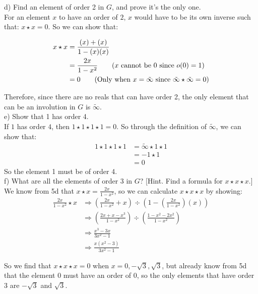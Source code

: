 \documentclass[20pt]{article}
\begin{document}
\begin{text}
    \noindent
    d) Find an element of order 2 in $G$, and prove it’s the only one.\\

    For an element $x$ to have an order of $2$, $x$ would have to be its own inverse such that: $x \star x = 0$. So we can show that:
    
    \begin{align}
        x \star x &= \frac{(x) + (x)}{1 - (x)(x)}\nonumber\\
        &= \frac{2x}{1-x^2}\tag{$x$ cannot be 0 since $o(0) = 1$}\nonumber\\
        &= 0\tag{Only when $x = \tilde{\infty}$ since $\tilde{\infty} \star \tilde{\infty} = 0$}\nonumber
    \end{align}

    Therefore, since there are no reals that can have order 2, the only element that can be an involution in $G$ is $\tilde{\infty}$.\\

    \noindent
    e) Show that 1 has order 4.\\
    
    If $1$ has order $4$, then $1 \star 1 \star 1 \star 1 = 0$. So through the definition of $\tilde{\infty}$, we can show that:
    \begin{align}
        1 \star 1 \star 1 \star 1 &= \tilde{\infty} \star 1 \star 1\nonumber\\
        &= -1 \star 1\nonumber\\
        &= 0\nonumber
    \end{align}
    So the element 1 must be of order 4.\\
    
    \noindent
    f) What are all the elements of order 3 in $G$? [Hint. Find a formula for $x \star x \star x$.]\\
    
    We know from 5d that $x \star x = \frac{2x}{1-x^2}$, so we can calculate $x \star x \star x$ by showing:
    \begin{align}
        \frac{2x}{1-x^2} \star x &\Longrightarrow (\frac{2x}{1-x^2} + x) \div (1 - (\frac{2x}{1-x^2})(x))\nonumber\\
        &\Longrightarrow (\frac{2x + x - x^3}{1 - x^2}) \div (\frac{1 - x^2 -2x^2}{1 - x^2})\nonumber\\
        &\Longrightarrow \frac{x^3 - 3x}{3x^2 - 1}\nonumber\\
        &\Longrightarrow \frac{x(x^2 - 3)}{3x^2 - 1}\nonumber
    \end{align}
    
    So we find that $x \star x \star x = 0$ when $x = 0, -\sqrt{3}, \sqrt{3}$, but already know from 5d that the element $0$ must have an order of 0, so the only elements that have order 3 are $-\sqrt{3}$ and $\sqrt{3}$.
\end{text}
\end{document}
